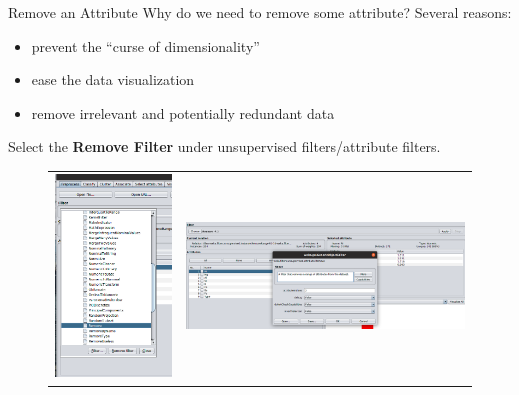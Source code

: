 \documentclass{beamer}
\begin{document}
\begin{frame}[t]{Remove an Attribute}
{\color{red} Why do we need to remove some attribute?}
\pause
Several reasons:
\begin{itemize}
\item prevent the ``curse of dimensionality''
\item ease the data visualization
\item remove irrelevant and potentially redundant data
\end{itemize}

Select the \textbf{Remove Filter} under  \textsf{unsupervised filters/attribute filters}.

\centering
\begin{figure}
\begin{tabular}{lr}
\includegraphics[scale=0.6]{img/remove.png} & \includegraphics[scale=0.4]{img/remove2.png} \\

\end{tabular}
\end{figure}
\end{frame}
\end{document}
